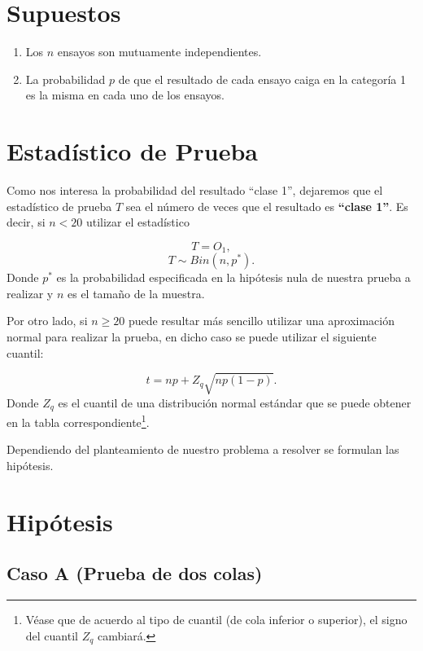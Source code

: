 \documentclass[
  a4paper,
  oneside,
  openany]{book}
\begin{document}
\hypertarget{supuestos}{%
\section{Supuestos}\label{supuestos}}

\begin{enumerate}
\def\labelenumi{\arabic{enumi})}
\item
  Los \(n\) ensayos son mutuamente independientes.
\item
  La probabilidad \(p\) de que el resultado de cada ensayo caiga en la categoría 1 es la misma en cada uno de los ensayos.
\end{enumerate}

\hypertarget{estaduxedstico-de-prueba}{%
\section{Estadístico de Prueba}\label{estaduxedstico-de-prueba}}

Como nos interesa la probabilidad del resultado ``clase 1'', dejaremos que el estadístico de prueba \(T\) sea el número de veces que el resultado es \textbf{``clase 1''}.
Es decir, si \(n<20\) utilizar el estadístico

\[T=O_{1},\]
\[ T \sim Bin (n,p^*).\]
Donde \(p^*\) es la probabilidad especificada en la hipótesis nula de nuestra prueba a realizar y \(n\) es el tamaño de la muestra.

Por otro lado, si \(n\geq20\) puede resultar más sencillo utilizar una aproximación normal para realizar la prueba, en dicho caso se puede utilizar el siguiente cuantil:

\[t=np+Z_{q}\sqrt{np(1-p)}.\]
Donde \(Z_{q}\) es el cuantil de una distribución normal estándar que se puede obtener en la tabla correspondiente\footnote{Véase que de acuerdo al tipo de cuantil (de cola inferior o superior), el signo del cuantil \(Z_q\) cambiará.}.

Dependiendo del planteamiento de nuestro problema a resolver se formulan las hipótesis.

\hypertarget{hipuxf3tesis}{%
\section{Hipótesis}\label{hipuxf3tesis}}

\hypertarget{caso-a-prueba-de-dos-colas}{%
\subsection*{Caso A (Prueba de dos colas)}\label{caso-a-prueba-de-dos-colas}}
\end{document}
